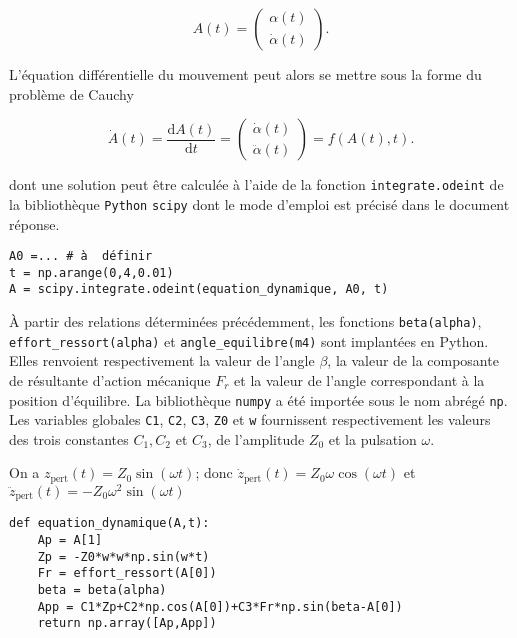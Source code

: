 $$
A(t)=\left(\begin{array}{c}
\alpha(t) \\
\dot{\alpha}(t)
\end{array}\right) .
$$

L'équation différentielle du mouvement peut alors se mettre sous la forme du problème de Cauchy

$$
\dot{A}(t)=\frac{\mathrm{d} A(t)}{\mathrm{d} t}=\left(\begin{array}{c}
\dot{\alpha}(t) \\
\ddot{\alpha}(t)
\end{array}\right)=f(A(t), t) .
$$

dont une solution peut être calculée à l'aide de la fonction \texttt{integrate.odeint} de la bibliothèque \texttt{Python} \texttt{scipy} dont le mode d'emploi est précisé dans le document réponse. 

\begin{lstlisting}
A0 =... # à  définir
t = np.arange(0,4,0.01)
A = scipy.integrate.odeint(equation_dynamique, A0, t)
\end{lstlisting}

À partir des relations déterminées précédemment, les fonctions \texttt{beta(alpha)}, \texttt{effort\_ressort(alpha)} et \texttt{angle\_equilibre(m4)} sont implantées en Python. Elles renvoient respectivement la valeur de l'angle $\beta$, la valeur de la composante de résultante d'action mécanique $F_{r}$ et la valeur de l'angle correspondant à la position d'équilibre. La bibliothèque \texttt{numpy} a été importée sous le nom abrégé \texttt{np}. Les variables globales \texttt{C1}, \texttt{C2}, \texttt{C3}, \texttt{Z0} et \texttt{w} fournissent respectivement les valeurs des trois constantes $C_{1}, C_{2}$ et $C_{3}$, de l'amplitude $Z_{0}$ et la pulsation $\omega$.
\fi

\ifprof
\begin{corrige}
On a $z_{\text{pert}}(t)=Z_0\sin\left(\omega t\right)$; 
donc $\dot{z}_{\text{pert}}(t)=Z_0\omega\cos\left(\omega t\right)$
et $\ddot{z}_{\text{pert}}(t)=-Z_0\omega^2\sin\left(\omega t\right)$
\begin{lstlisting}
def equation_dynamique(A,t):
    Ap = A[1]
    Zp = -Z0*w*w*np.sin(w*t)
    Fr = effort_ressort(A[0])
    beta = beta(alpha)
    App = C1*Zp+C2*np.cos(A[0])+C3*Fr*np.sin(beta-A[0])
    return np.array([Ap,App])
\end{lstlisting}
\end{corrige}
\else
\fi

